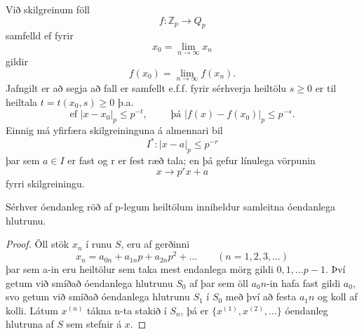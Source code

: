 \begin{skilgr}
Við skilgreinum föll
\begin{equation*}
f:\mathbb{Z}_p \rightarrow Q_p
\end{equation*}
samfelld ef fyrir 
\begin{equation*}
x_0 = \lim_{n \rightarrow \infty} x_n
\end{equation*}
gildir
\begin{equation*}
f(x_0) = \lim_{n \rightarrow \infty} f(x_n).
\end{equation*}
Jafngilt er að segja að fall er samfellt e.f.f. fyrir sérhverja heiltölu $s\geq 0$ er til heiltala $t = t(x_0,s)\geq 0$ þ.a.
\begin{equation*}
\mbox{ef } |x-x_0|_p \leq p^{-t},\qquad \mbox{  þá } |f(x)-f(x_0)|_p \leq p^{-s}.
\end{equation*}
Einnig má yfirfæra skilgreininguna á almennari bil
\begin{equation*}
I^* : |x-a|_p \leq p^{-r}
\end{equation*} 
þar sem $a \in I$ er fast og r er fest ræð tala; en þá gefur línulega vörpunin 
\begin{equation*}
x \rightarrow p^rx+a
\end{equation*}
fyrri skilgreiningu.
\end{skilgr}

\begin{hjalparsetn}
Sérhver óendanleg röð af p-legum heiltölum inniheldur samleitna óendanlega hlutrunu. 
\end{hjalparsetn}
\begin{proof}
Öll stök $x_n$ í runu $S$, eru af gerðinni
\begin{equation*}
x_n = a_{0n} + a_{1n}p+a_{2n}p^2 + \ldots \qquad (n= 1,2,3,\ldots)
\end{equation*}
þar sem a-in eru heiltölur sem taka mest endanlega mörg gildi $0,1, \ldots p-1$.
Því getum við smíðað óendanlega hlutrunu $S_0$ af þar sem öll $a_0n$-in hafa fast gildi $a_0$, svo getum við 
smíðað óendanlega hlutrunu $S_1$ í $S_0$ með því að festa $a_1n$ og koll af kolli.
Látum $x^{(n)}$ tákna n-ta stakið í $S_n$, þá er $\{x^{(1)},x^{(2)},\ldots \}$ óendanleg hlutruna af $S$ sem stefnir á $x$. 
\end{proof}


